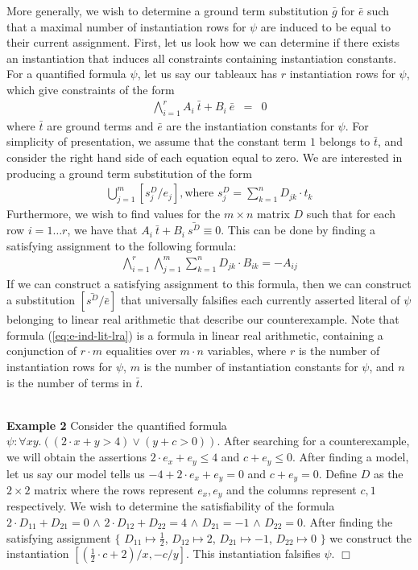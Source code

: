 \documentclass{llncs}
\begin{document}
More generally, we wish to determine a ground term substitution $\bar{g}$ for $\bar{e}$ such that a maximal number of instantiation rows for $\psi$ are induced to be equal to their current assignment. 
First, let us look how we can determine if there exists an instantiation that induces all constraints containing instantiation constants.
For a quantified formula $\psi$, let us say our tableaux has $r$ instantiation rows for $\psi$, which give constraints of the form
\begin{eqnarray}
\displaystyle\bigwedge\limits_{i=1}^r A_i\ \bar{t} + B_i\ \bar{e} & = & 0
\end{eqnarray}
where $\bar{t}$ are ground terms and $\bar{e}$ are the instantiation constants for $\psi$.  
For simplicity of presentation, we assume that the constant term $1$ belongs to $\bar{t}$, and consider the right hand side of each equation equal to zero.
We are interested in producing a ground term substitution of the form
\begin{eqnarray}
\displaystyle\bigcup\limits_{j=1}^m [ s^D_j / e_j ],
\text{where } s^D_j = \displaystyle\sum\limits_{k=1}^n D_{jk} \cdot t_k
\end{eqnarray}
Furthermore, we wish to find values for the $m \times n$ matrix $D$ such that for each row $i = 1 \ldots r$, we have that $A_i\ \bar{t} + B_i\ \bar{s^D} \equiv 0$.
This can be done by finding a satisfying assignment to the following formula:
\begin{eqnarray}
\label{eq:e-ind-lit-lra}
\displaystyle\bigwedge\limits_{i=1}^r \displaystyle\bigwedge\limits_{j=1}^m \displaystyle\sum\limits_{k=1}^n D_{jk} \cdot B_{ik} = -A_{ij}
\end{eqnarray}
If we can construct a satisfying assignment to this formula, then we can construct a substitution $[\bar{s^D}/\bar{e}]$ that universally falsifies each currently asserted literal of $\psi$ belonging to linear real arithmetic that describe our counterexample.
Note that formula (\ref{eq:e-ind-lit-lra}) is a formula in linear real arithmetic, containing a conjunction of $r \cdot m$ equalities over $m \cdot n$ variables, where $r$ is the number of instantiation rows for $\psi$, $m$ is the number of instantiation constants for $\psi$, and $n$ is the number of terms in $\bar{t}$.

\ \\

{\bf Example 2}
Consider the quantified formula $\psi : \forall x y. ((2 \cdot x + y > 4) \vee (y + c > 0))$.
After searching for a counterexample, we will obtain the assertions $2 \cdot e_x + e_y \leq 4$ and $c + e_y \leq 0$.
After finding a model, let us say our model tells us $-4 + 2 \cdot e_x + e_y = 0$ and $c + e_y = 0$.
Define $D$ as the $2 \times 2$ matrix where the rows represent $e_x, e_y$ and the columns represent $c, 1$ respectively.
We wish to determine the satisfiability of the formula $2 \cdot D_{11} + D_{21} = 0$ $\wedge$ $2 \cdot D_{12} + D_{22} = 4$ $\wedge$ $D_{21} = -1$ $\wedge$ $D_{22} = 0$.
After finding the satisfying assignment $\{$ $D_{11} \mapsto \frac{1}{2}$, $D_{12} \mapsto 2$, $D_{21} \mapsto -1$, $D_{22} \mapsto 0$ $\}$ we construct the instantiation $[(\frac{1}{2} \cdot c + 2)/x, -c/y]$.
This instantiation falsifies $\psi$. $\Box$
\end{document}
